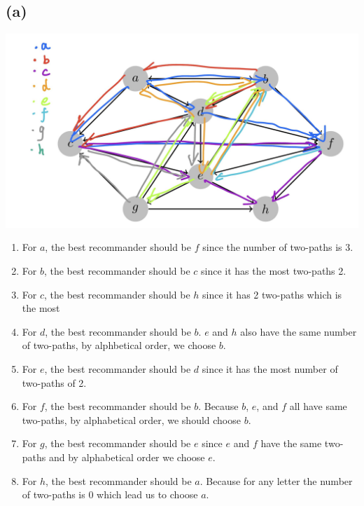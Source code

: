 \documentclass{article}
\begin{document}
\subsection*{(a)}
\includegraphics[scale = 0.25]{graph.jpg}

\begin{enumerate}
    \item For $a$, the best recommander should be $f$ since the number of two-paths is 3.
    \item For $b$, the best recommander should be $c$ since it has the most two-paths 2.
    \item For $c$, the best recommander should be $h$ since it has 2 two-paths which is the most
    \item For $d$, the best recommander should be $b$. $e$ and $h$ also have the same number of two-paths, by alphbetical order, we choose $b$.
    \item For $e$, the best recommander should be $d$ since it has the most number of two-paths of 2.
    \item For $f$, the best recommander should be $b$. Because $b$, $e$, and $f$ all have same two-paths, by alphabetical order, we should choose $b$.
    \item For $g$, the best recommander should be $e$ since $e$ and $f$ have the same two-paths and by alphabetical order we choose $e$.
    \item For $h$, the best recommander should be $a$. Because for any letter the number of two-paths is 0 which lead us to choose $a$.
\end{enumerate}
\end{document}
